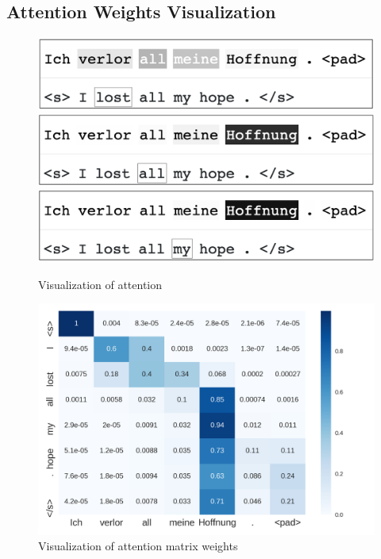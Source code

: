 \documentclass[12pt]{article}
\begin{document}
\subsection{Attention Weights Visualization}
\begin{figure}
	\centering
	\includegraphics[width=.8\linewidth]{figs/attn1.png}
	\includegraphics[width=.8\linewidth]{figs/attn2.png}
	\includegraphics[width=.8\linewidth]{figs/attn3.png}
	\caption{Visualization of attention}
\end{figure}

\begin{figure}
	\centering
	\includegraphics[width=.8\linewidth]{figs/attn_mat.png}
	\caption{Visualization of attention matrix weights}
\end{figure}
\end{document}
